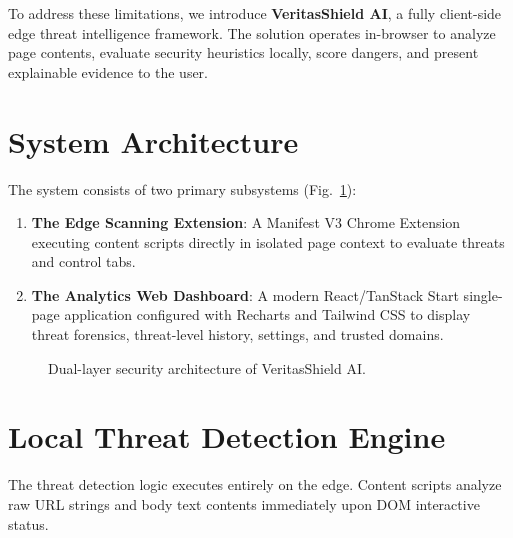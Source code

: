\documentclass[conference]{IEEEtran}
\begin{document}
To address these limitations, we introduce \textbf{VeritasShield AI}, a fully client-side edge threat intelligence framework. The solution operates in-browser to analyze page contents, evaluate security heuristics locally, score dangers, and present explainable evidence to the user.

\section{System Architecture}
The system consists of two primary subsystems (Fig.~\ref{fig:arch}):
\begin{enumerate}
    \item \textbf{The Edge Scanning Extension}: A Manifest V3 Chrome Extension executing content scripts directly in isolated page context to evaluate threats and control tabs.
    \item \textbf{The Analytics Web Dashboard}: A modern React/TanStack Start single-page application configured with Recharts and Tailwind CSS to display threat forensics, threat-level history, settings, and trusted domains.
\end{enumerate}

\begin{figure}[htbp]
    \centering
    \caption{Dual-layer security architecture of VeritasShield AI.}
    \label{fig:arch}
\end{figure}

\section{Local Threat Detection Engine}
The threat detection logic executes entirely on the edge. Content scripts analyze raw URL strings and body text contents immediately upon DOM interactive status. 
\end{document}
